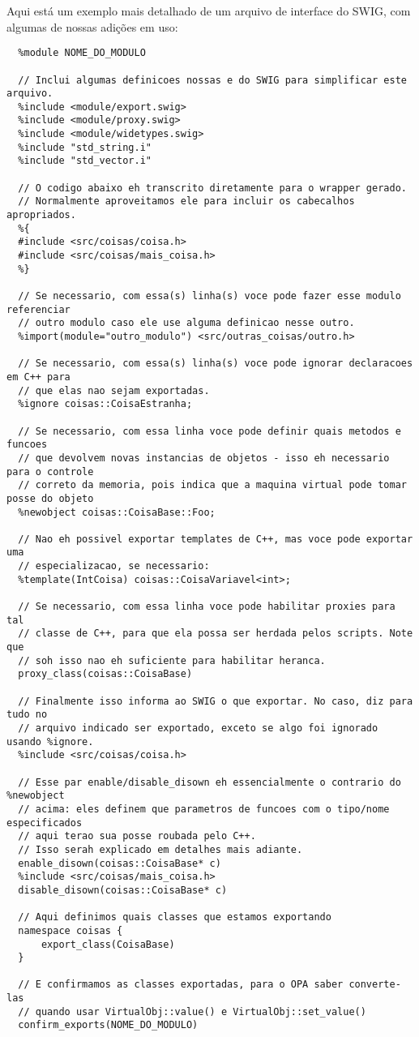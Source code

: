   Aqui está um exemplo mais detalhado de um arquivo de interface do SWIG, com algumas 
  de nossas adições em uso:
  \vspace{1em}
  \begin{lstlisting}
  %module NOME_DO_MODULO

  // Inclui algumas definicoes nossas e do SWIG para simplificar este arquivo.
  %include <module/export.swig>
  %include <module/proxy.swig>
  %include <module/widetypes.swig>
  %include "std_string.i"
  %include "std_vector.i"
  
  // O codigo abaixo eh transcrito diretamente para o wrapper gerado.
  // Normalmente aproveitamos ele para incluir os cabecalhos apropriados.
  %{
  #include <src/coisas/coisa.h>
  #include <src/coisas/mais_coisa.h>
  %}

  // Se necessario, com essa(s) linha(s) voce pode fazer esse modulo referenciar 
  // outro modulo caso ele use alguma definicao nesse outro.
  %import(module="outro_modulo") <src/outras_coisas/outro.h>

  // Se necessario, com essa(s) linha(s) voce pode ignorar declaracoes em C++ para 
  // que elas nao sejam exportadas.
  %ignore coisas::CoisaEstranha;
  
  // Se necessario, com essa linha voce pode definir quais metodos e funcoes
  // que devolvem novas instancias de objetos - isso eh necessario para o controle 
  // correto da memoria, pois indica que a maquina virtual pode tomar posse do objeto
  %newobject coisas::CoisaBase::Foo;
  
  // Nao eh possivel exportar templates de C++, mas voce pode exportar uma 
  // especializacao, se necessario:
  %template(IntCoisa) coisas::CoisaVariavel<int>;

  // Se necessario, com essa linha voce pode habilitar proxies para tal 
  // classe de C++, para que ela possa ser herdada pelos scripts. Note que
  // soh isso nao eh suficiente para habilitar heranca.
  proxy_class(coisas::CoisaBase)

  // Finalmente isso informa ao SWIG o que exportar. No caso, diz para tudo no
  // arquivo indicado ser exportado, exceto se algo foi ignorado usando %ignore.
  %include <src/coisas/coisa.h>
  
  // Esse par enable/disable_disown eh essencialmente o contrario do %newobject
  // acima: eles definem que parametros de funcoes com o tipo/nome especificados
  // aqui terao sua posse roubada pelo C++. 
  // Isso serah explicado em detalhes mais adiante.
  enable_disown(coisas::CoisaBase* c)
  %include <src/coisas/mais_coisa.h>
  disable_disown(coisas::CoisaBase* c)

  // Aqui definimos quais classes que estamos exportando
  namespace coisas {
      export_class(CoisaBase)
  }

  // E confirmamos as classes exportadas, para o OPA saber converte-las
  // quando usar VirtualObj::value() e VirtualObj::set_value()
  confirm_exports(NOME_DO_MODULO)
  \end{lstlisting}
  
